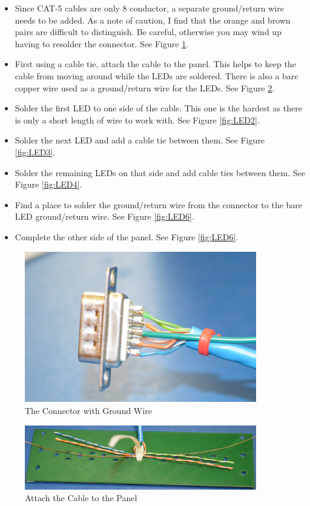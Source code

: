 \documentclass[10pt, openany]{book}
\begin{document}
\begin{itemize}
  \item Since CAT-5 cables are only 8 conductor, a separate ground/return wire needs to be added.  As a note of caution, I find that the orange and brown pairs are difficult to distinguish.  Be careful, otherwise you may wind up having to resolder the connector.  See Figure \ref{fig:LED5}.
  \item First using a cable tie, attach the cable to the panel.  This helps to keep the cable from moving around while the LEDs are soldered.  There is also a bare copper wire used as a ground/return wire for the LEDs.  See Figure \ref{fig:LED1}.
  \item Solder the first LED to one side of the cable.  This one is the hardest as there is only a short length of wire to work with.  See Figure \ref{fig:LED2}.
  \item Solder the next LED and add a cable tie between them.  See Figure \ref{fig:LED3}.
  \item Solder the remaining LEDs on that side and add cable ties between them.  See Figure \ref{fig:LED4}.
  \item Find a place to solder the ground/return wire from the connector to the bare LED ground/return wire.  See Figure \ref{fig:LED6}.
  \item Complete the other side of the panel.  See Figure \ref{fig:LED6}.
\end{itemize}

\begin{figure}[ht!]
  \centering
  \includegraphics[width=0.9\textwidth]{../Pict/LEDs5.jpg}
  \caption{The Connector with Ground Wire}
  \label{fig:LED5}
\end{figure}

\begin{figure}[ht!]
  \centering
  \includegraphics[width=0.9\textwidth]{../Pict/LEDs1.jpg}
  \caption{Attach the Cable to the Panel}
  \label{fig:LED1}
\end{figure}
\end{document}
